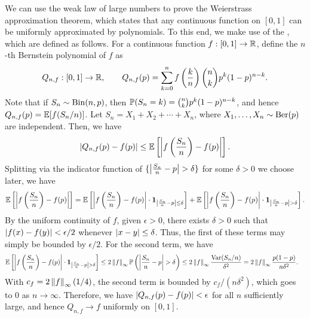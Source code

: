We can use the weak law of large numbers to prove the Weierstrass approximation theorem, which states that any continuous function on $[0,1]$ can be uniformly approximated by polynomials. To this end, we make use of the , which are defined as follows. For a continuous function $f:[0,1] \to \mathbb{R}$, define the $n$-th Bernstein polynomial of $f$ as
\begin{align}
    Q_{n,f}:[0,1] \to \mathbb{R}, \qquad Q_{n,f}(p) = \sum_{k=0}^{n} f\left(\frac{k}{n}\right) \binom{n}{k} p^{k}(1-p)^{n-k}.
\end{align}
Note that if $S_{n} \sim \operatorname{Bin}(n,p)$, then $\mathbb{P}(S_{n}=k) = \binom{n}{k} p^{k}(1-p)^{n-k}$, and hence $Q_{n,f}(p) = \mathbb{E}[f(S_{n}/n)]$. Let $S_{n} = X_{1}+X_{2}+\cdots+X_{n}$, where $X_{1},\ldots,X_{n} \sim \operatorname{Ber}(p)$ are independent. Then, we have
\begin{align}
    \left| Q_{n,f}(p)-f(p) \right| \leq \mathbb{E}\left[ \left| f\left(\frac{S_{n}}{n}\right) - f(p) \right| \right].
\end{align}
Splitting via the indicator function of $\{\left| \frac{S_{n}}{n}-p \right| > \delta \}$ for some $\delta > 0$ we choose later, we have
\begin{align}
    \mathbb{E}\left[ \left| f\left(\frac{S_{n}}{n}\right) - f(p) \right| \right] = \mathbb{E}\left[ \left| f\left(\frac{S_{n}}{n}\right) - f(p) \right| \cdot \textbf{1}_{\left| \frac{S_{n}}{n}-p \right| \leq \delta } \right] + \mathbb{E}\left[ \left| f\left(\frac{S_{n}}{n}\right) - f(p) \right| \cdot \textbf{1}_{\left| \frac{S_{n}}{n}-p \right| > \delta} \right].
\end{align}
By the uniform continuity of $f$, given $\epsilon > 0$, there exists $\delta > 0$ such that $\left| f(x)-f(y) \right| < \epsilon/2$ whenever $\left| x-y \right| \leq \delta$. Thus, the first of these terms may simply be bounded by $\epsilon/2$. For the second term, we have
\begin{align}
    \mathbb{E}\left[ \left| f\left(\frac{S_{n}}{n}\right) - f(p) \right| \cdot \textbf{1}_{\left| \frac{S_{n}}{n}-p \right| > \delta} \right] &\leq 2\left\lVert f\right\rVert_{\infty} \mathbb{P}\left(\left| \frac{S_{n}}{n}-p \right| > \delta\right) \leq 2\left\lVert f\right\rVert_{\infty} \frac{\operatorname{Var}(S_{n}/n)}{\delta^{2}} = 2\left\lVert f\right\rVert_{\infty} \frac{p(1-p)}{n\delta^{2}}.
\end{align}
With $c_{f} = 2\left\lVert f\right\rVert_{\infty}(1/4)$, the second term is bounded by $c_{f}/(n\delta^{2})$, which goes to $0$ as $n \to \infty$. Therefore, we have $\left| Q_{n,f}(p)-f(p) \right| < \epsilon$ for all $n$ sufficiently large, and hence $Q_{n,f} \to f$ uniformly on $[0,1]$.

